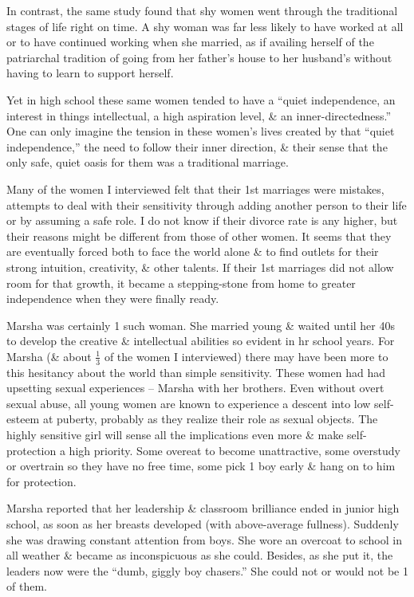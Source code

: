 \documentclass{article}
\numberwithin{equation}{section}
\begin{document}
In contrast, the same study found that shy women went through the traditional stages of life right on time. A shy woman was far less likely to have worked at all or to have continued working when she married, as if availing herself of the patriarchal tradition of going from her father's house to her husband's without having to learn to support herself.

Yet in high school these same women tended to have a ``quiet independence, an interest in things intellectual, a high aspiration level, \& an inner-directedness.'' One can only imagine the tension in these women's lives created by that ``quiet independence,'' the need to follow their inner direction, \& their sense that the only safe, quiet oasis for them was a traditional marriage.

Many of the women I interviewed felt that their 1st marriages were mistakes, attempts to deal with their sensitivity through adding another person to their life or by assuming a safe role. I do not know if their divorce rate is any higher, but their reasons might be different from those of other women. It seems that they are eventually forced both to face the world alone \& to find outlets for their strong intuition, creativity, \& other talents. If their 1st marriages did not allow room for that growth, it became a stepping-stone from home to greater independence when they were finally ready.

Marsha was certainly 1 such woman. She married young \& waited until her 40s to develop the creative \& intellectual abilities so evident in hr school years. For Marsha (\& about $\frac{1}{3}$ of the women I interviewed) there may have been more to this hesitancy about the world than simple sensitivity. These women had had upsetting sexual experiences -- Marsha with her brothers. Even without overt sexual abuse, all young women are known to experience a descent into low self-esteem at puberty, probably as they realize their role as sexual objects. The highly sensitive girl will sense all the implications even more \& make self-protection a high priority. Some overeat to become unattractive, some overstudy or overtrain so they have no free time, some pick 1 boy early \& hang on to him for protection.

Marsha reported that her leadership \& classroom brilliance ended in junior high school, as soon as her breasts developed (with above-average fullness). Suddenly she was drawing constant attention from boys. She wore an overcoat to school in all weather \& became as inconspicuous as she could. Besides, as she put it, the leaders now were the ``dumb, giggly boy chasers.'' She could not or would not be 1 of them.
\end{document}
